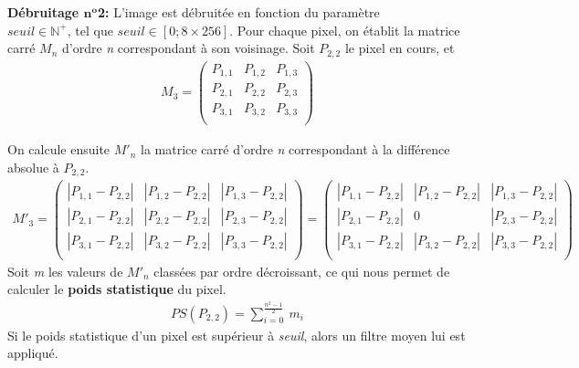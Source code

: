 \documentclass{article}
\newcommand{\N}{\mathbb{N}} %
\begin{document}
		
		\newpage
		
		
		\textbf{Débruitage \begin{math}\textbf{n}^\textbf{o}\end{math}2: }L'image est débruitée en fonction du paramètre \begin{math}seuil \in \N^+ \text{, tel que } seuil \in [0;8\times256]\end{math}. Pour chaque pixel, on établit la matrice carré \begin{math}M_n\end{math} d'ordre \emph{n} correspondant à son voisinage. Soit \begin{math}P_{2,2}\end{math} le pixel en cours, et
		 \begin{align*}M_{3} = \begin{pmatrix}
			P_{1,1} & P_{1,2} & P_{1,3}\\
			P_{2,1} & P_{2,2} & P_{2,3}\\
			P_{3,1} & P_{3,2} & P_{3,3}\\
		\end{pmatrix}\end{align*}
		
		\noindent On calcule ensuite \begin{math}M'_n\end{math} la matrice carré d'ordre \emph{n} correspondant à la différence absolue à \begin{math}P_{2,2}\end{math}.
		\begin{align*}
			M'_3 =
			\begin{pmatrix}
				|P_{1,1}-P_{2,2}| & |P_{1,2}-P_{2,2}| & |P_{1,3}-P_{2,2}|\\
				|P_{2,1}-P_{2,2}| & |P_{2,2}-P_{2,2}| & |P_{2,3}-P_{2,2}|\\
				|P_{3,1}-P_{2,2}| & |P_{3,2}-P_{2,2}| & |P_{3,3}-P_{2,2}|\\
			\end{pmatrix}
			=
			\begin{pmatrix}
				|P_{1,1}-P_{2,2}| & |P_{1,2}-P_{2,2}| & |P_{1,3}-P_{2,2}|\\
				|P_{2,1}-P_{2,2}| & 0                 & |P_{2,3}-P_{2,2}|\\
				|P_{3,1}-P_{2,2}| & |P_{3,2}-P_{2,2}| & |P_{3,3}-P_{2,2}|\\
			\end{pmatrix}
		\end{align*}
		\noindent Soit \emph{m} les valeurs de \begin{math}M'_n\end{math} classées par ordre décroissant, ce qui nous permet de calculer le \textbf{poids statistique} du pixel.
		\begin{align*}
			PS(P_{2,2}) = \sum_{i=0}^{\frac{n^2-1}{2}}{\ m_i}
		\end{align*}
		Si le poids statistique d'un pixel est supérieur à \emph{seuil}, alors un filtre moyen lui est appliqué.
		
\end{document}
